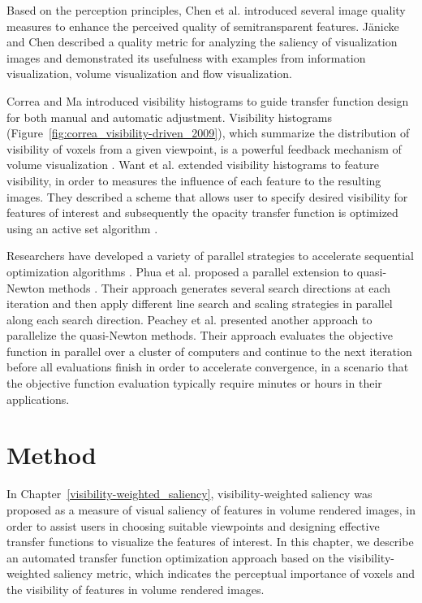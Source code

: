 Based on the perception principles, Chen et al. \cite{chan_perception-based_2009} introduced several image quality measures to enhance the perceived quality of semitransparent features.
J{\"a}nicke and Chen \cite{janicke_salience-based_2010} described a quality metric for analyzing the saliency of visualization images and demonstrated its usefulness with examples from information visualization, volume visualization and flow visualization.

Correa and Ma \cite{correa_visibility-driven_2009} introduced visibility histograms to guide transfer function design for both manual and automatic adjustment.
Visibility histograms (Figure~\ref{fig:correa_visibility-driven_2009}), which summarize the distribution of visibility of voxels from a given viewpoint, is a powerful feedback mechanism of volume visualization \cite{emsenhuber_visibility_2008}.
Want et al. \cite{wang_efficient_2011} extended visibility histograms to feature visibility, in order to measures the influence of each feature to the resulting images. They described a scheme that allows user to specify desired visibility for features of interest and subsequently the opacity transfer function is optimized using an active set algorithm \cite{polyak_conjugate_1969}.


Researchers have developed a variety of parallel strategies to accelerate sequential optimization algorithms \cite{spedicato_algorithms_2012}.
Phua et al. \cite{phua_parallel_1998} proposed a parallel extension to quasi-Newton methods \cite{yang_optimization_2001}. Their approach generates several search directions at each iteration and then apply different line search and scaling strategies in parallel along each search direction.
Peachey et al. \cite{peachey_parallel_2009} presented another approach to parallelize the quasi-Newton methods. Their approach evaluates the objective function in parallel over a cluster of computers and continue to the next iteration before all evaluations finish in order to accelerate convergence, in a scenario that the objective function evaluation typically require minutes or hours in their applications.

\section{Method}
In Chapter~\ref{visibility-weighted_saliency}, visibility-weighted saliency was proposed as a measure of visual saliency of features in volume rendered images, in order to assist users in choosing suitable viewpoints and designing effective transfer functions to visualize the features of interest. In this chapter, we describe an automated transfer function optimization approach based on the visibility-weighted saliency metric, which indicates the perceptual importance of voxels and the visibility of features in volume rendered images.

